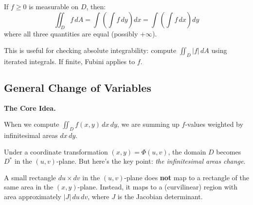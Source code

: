 \documentclass[11pt]{report}
\begin{document}
\begin{theorem}
If $f \geq 0$ is measurable on $D$, then:
\[
\iint_D f \, dA = \int \left( \int f \, dy \right) dx = \int \left( \int f \, dx \right) dy
\]
where all three quantities are equal (possibly $+\infty$).

This is useful for checking absolute integrability: compute $\iint_D |f| \, dA$ using iterated integrals. If finite, Fubini applies to $f$.
\end{theorem}

\subsection{General Change of Variables}

\noindent\textbf{The Core Idea.}

When we compute $\iint_D f(x,y) \, dx \, dy$, we are summing up $f$-values weighted by infinitesimal areas $dx \, dy$.

Under a coordinate transformation $(x, y) = \Phi(u, v)$, the domain $D$ becomes $D^*$ in the $(u, v)$-plane. But here's the key point: \textit{the infinitesimal areas change}.

A small rectangle $du \times dv$ in the $(u,v)$-plane does \textbf{not} map to a rectangle of the same area in the $(x,y)$-plane. Instead, it maps to a (curvilinear) region with area approximately $|J| \, du \, dv$, where $J$ is the Jacobian determinant.

\begin{center}
\end{center}
\end{document}
